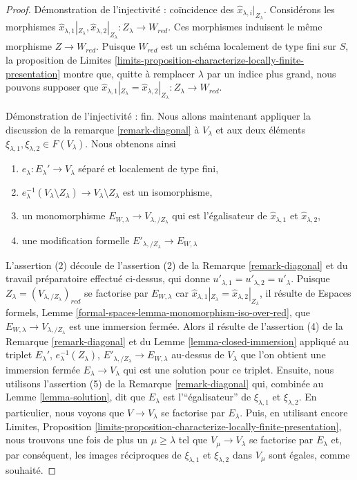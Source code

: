 \begin{proof}
\medskip\noindent
Démonstration de l'injectivité : coïncidence des $\hat x_{\lambda, i}|_{Z_\lambda}$.
Considérons les morphismes
$\hat x_{\lambda, 1}|_{Z_\lambda}, \hat x_{\lambda, 2}|_{Z_\lambda} :
Z_\lambda \to W_{red}$.
Ces morphismes induisent le même morphisme $Z \to W_{red}$.
Puisque $W_{red}$ est un schéma localement de type fini sur $S$,
la proposition de Limites
\ref{limits-proposition-characterize-locally-finite-presentation}
montre que, quitte à remplacer $\lambda$ par un indice plus grand,
nous pouvons supposer que
$\hat x_{\lambda, 1}|_{Z_\lambda} = \hat x_{\lambda, 2}|_{Z_\lambda} :
Z_\lambda \to W_{red}$.

\medskip\noindent
Démonstration de l'injectivité : fin.
Nous allons maintenant appliquer la discussion de la
remarque \ref{remark-diagonal} à $V_\lambda$ et aux deux éléments
$\xi_{\lambda, 1}, \xi_{\lambda, 2} \in F(V_\lambda)$.
Nous obtenons ainsi
\begin{enumerate}
\item $e_\lambda : E_\lambda' \to V_\lambda$
séparé et localement de type fini,
\item $e_\lambda^{-1}(V_\lambda \setminus Z_\lambda) \to
V_\lambda \setminus Z_\lambda$ est un isomorphisme,
\item un monomorphisme $E_{W, \lambda} \to V_{\lambda, /Z_\lambda}$
qui est l'égalisateur de $\hat x_{\lambda, 1}$ et $\hat x_{\lambda, 2}$,
\item une modification formelle $E'_{\lambda, /Z_\lambda} \to E_{W, \lambda}$
\end{enumerate}
L'assertion (2) découle de l'assertion (2) de la Remarque \ref{remark-diagonal}
et du travail préparatoire effectué ci-dessus, qui donne
$u'_{\lambda, 1} = u'_{\lambda, 2} = u'_\lambda$.
Puisque $Z_\lambda = (V_{\lambda, /Z_\lambda})_{red}$ se factorise par
$E_{W, \lambda}$ car
$\hat x_{\lambda, 1}|_{Z_\lambda} = \hat x_{\lambda, 2}|_{Z_\lambda}$,
il résulte de
Espaces formels, Lemme \ref{formal-spaces-lemma-monomorphism-iso-over-red},
que $E_{W, \lambda} \to V_{\lambda, /Z_\lambda}$ est une immersion fermée.
Alors il résulte de l'assertion (4) de la Remarque \ref{remark-diagonal}
et du Lemme \ref{lemma-closed-immersion} appliqué au triplet
$E_\lambda'$, $e_\lambda^{-1}(Z_\lambda)$,
$E'_{\lambda, /Z_\lambda} \to E_{W, \lambda}$ au-dessus de $V_\lambda$ que
l'on obtient une immersion fermée $E_\lambda \to V_\lambda$
qui est une solution pour ce triplet.
Ensuite, nous utilisons l'assertion (5) de la Remarque \ref{remark-diagonal}
qui, combinée au Lemme \ref{lemma-solution},
dit que $E_\lambda$ est l'``égalisateur'' de $\xi_{\lambda, 1}$
et $\xi_{\lambda, 2}$. En particulier, nous voyons que $V \to V_\lambda$
se factorise par $E_\lambda$. Puis, en utilisant encore Limites, Proposition
\ref{limits-proposition-characterize-locally-finite-presentation},
nous trouvons une fois de plus un $\mu \geq \lambda$ tel que $V_\mu \to V_\lambda$
se factorise par $E_\lambda$ et, par conséquent, les images réciproques de
$\xi_{\lambda, 1}$ et $\xi_{\lambda, 2}$ dans $V_\mu$ sont égales,
comme souhaité.


\end{proof}
